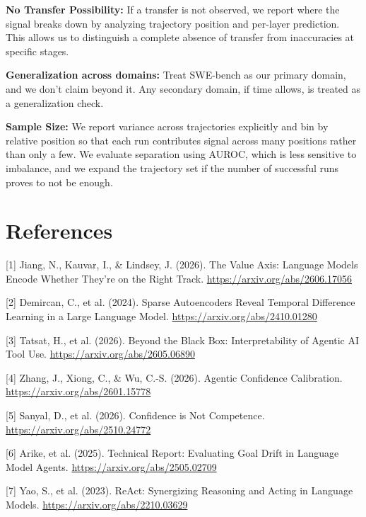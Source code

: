 \documentclass{article}
\begin{document}
\textbf{No Transfer Possibility:} If a transfer is not observed, we report where the signal breaks down by analyzing trajectory position and per-layer prediction. This allows us to distinguish a complete absence of transfer from inaccuracies at specific stages.

\textbf{Generalization across domains:} Treat SWE-bench as our primary domain, and we don't claim beyond it. Any secondary domain, if time allows, is treated as a generalization check.

\textbf{Sample Size:} We report variance across trajectories explicitly and bin by relative position so that each run contributes signal across many positions rather than only a few. We evaluate separation using AUROC, which is less sensitive to imbalance, and we expand the trajectory set if the number of successful runs proves to not be enough.

\section*{References}

{\small

[1] Jiang, N., Kauvar, I., \& Lindsey, J. (2026). The Value Axis: Language Models Encode Whether They're on the Right Track. \url{https://arxiv.org/abs/2606.17056}

[2] Demircan, C., et al. (2024). Sparse Autoencoders Reveal Temporal Difference Learning in a Large Language Model. \url{https://arxiv.org/abs/2410.01280}

[3] Tatsat, H., et al. (2026). Beyond the Black Box: Interpretability of Agentic AI Tool Use. \url{https://arxiv.org/abs/2605.06890}

[4] Zhang, J., Xiong, C., \& Wu, C.-S. (2026). Agentic Confidence Calibration. \url{https://arxiv.org/abs/2601.15778}

[5] Sanyal, D., et al. (2026). Confidence is Not Competence. \url{https://arxiv.org/abs/2510.24772}

[6] Arike, et al. (2025). Technical Report: Evaluating Goal Drift in Language Model Agents. \url{https://arxiv.org/abs/2505.02709}

[7] Yao, S., et al. (2023). ReAct: Synergizing Reasoning and Acting in Language Models. \url{https://arxiv.org/abs/2210.03629}

}
\end{document}
